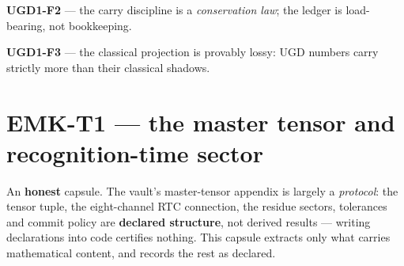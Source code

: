 \textbf{UGD1-F2} --- the carry discipline is a \emph{conservation law}; the ledger is
load-bearing, not bookkeeping.

\textbf{UGD1-F3} --- the classical projection is provably lossy: UGD numbers carry
strictly more than their classical shadows.

\hypertarget{emk-t1-the-master-tensor-and-recognition-time-sector}{%
\section{EMK-T1 --- the master tensor and recognition-time sector}\label{emk-t1-the-master-tensor-and-recognition-time-sector}}

An \textbf{honest} capsule. The vault's master-tensor appendix is largely a
\emph{protocol}: the tensor tuple, the eight-channel RTC connection, the
residue sectors, tolerances and commit policy are \textbf{declared structure},
not derived results --- writing declarations into code certifies nothing.
This capsule extracts only what carries mathematical content, and records
the rest as declared.

